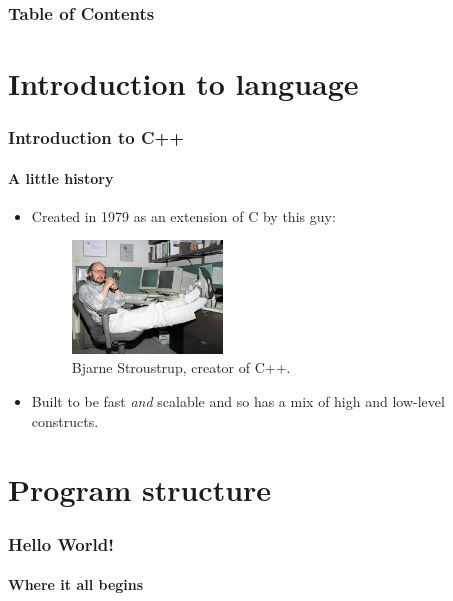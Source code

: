 \documentclass{beamer}
\subtitle{Session 0: Basics}
\begin{document}
\frame{\titlepage}

\begin{frame}
\frametitle{Table of Contents}
\tableofcontents
\end{frame}

\section{Introduction to language}

\begin{frame}
	\frametitle{Introduction to C++}
	\framesubtitle{A little history}
	\begin{itemize}
	  \item<1->{Created in 1979 as an extension of C by this guy:\pause
		\begin{figure}
			\includegraphics[height=30mm]{./figs/BjarneStroustrup.eps}
			\caption{Bjarne Stroustrup, creator of C++.}
		\end{figure}}
	  \item<3->{Built to be fast \textit{and} scalable and so has a mix of high and low-level constructs.}
	\end{itemize}
	
\end{frame}


\section{Program structure}



\begin{frame}[fragile]
  \frametitle{Hello World!}
  \framesubtitle{Where it all begins}

  \begin{columns}[t]
    \begin{column}[T]{0.55\textwidth}	
    \end{column}
    \begin{column}[T]{0.45\textwidth}
		\end{column}
	\end{columns}
\end{frame}
\end{document}
